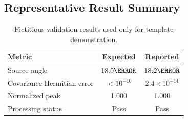 

\subsection{Representative Result Summary}

\begin{table}[H]
    \centering
    \caption{Fictitious validation results used only for template demonstration.}
    \label{tab:results}
    \begin{tabular}{@{}lcc@{}}
        \toprule
        Metric & Expected & Reported \\
        \midrule
        Source angle & $18.0\degree$ & $18.2\degree$ \\
        Covariance Hermitian error & $<10^{-10}$ & $2.4\times10^{-14}$ \\
        Normalized peak & 1.000 & 1.000 \\
        Processing status & Pass & Pass \\
        \bottomrule
    \end{tabular}
\end{table}
